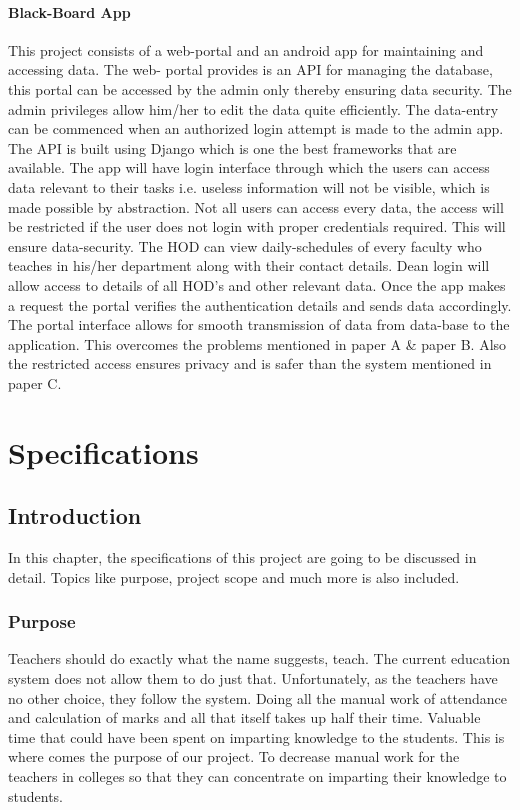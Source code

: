 \documentclass[BTech]{srmuthesis}
\begin{document}
\subsubsection{Black-Board App}
This project consists of a web-portal and an android app for maintaining and accessing data. The web-
portal provides is an \ac{API} for managing the database, this portal can be accessed by the admin only
thereby ensuring data security. The admin privileges allow him/her to edit the data quite efficiently. The
data-entry can be commenced when an authorized login attempt is made to the admin app. The \ac{API} is
built using Django which is one the best frameworks that are available. The app will have login interface
through which the users can access data relevant to their tasks i.e. useless information will not be
visible, which is made possible by abstraction. Not all users can access every data, the access will be
restricted if the user does not login with proper credentials required. This will ensure data-security. The
HOD can view daily-schedules of every faculty who teaches in his/her department along with their
contact details. Dean login will allow access to details of all HOD’s and other relevant data. Once the app
makes a request the portal verifies the authentication details and sends data accordingly. The portal
interface allows for smooth transmission of data from data-base to the application. This overcomes the
problems mentioned in paper A \& paper B. Also the restricted access ensures privacy and is safer than
the system mentioned in paper C.
\chapter{Specifications}
\section{Introduction}
In this chapter, the specifications of this project are going to be discussed in detail. Topics like purpose, project scope and much more is also included.
\subsection{Purpose}
Teachers should do exactly what the name suggests, teach. The current education system does not allow them to do just that. Unfortunately, as the teachers have no other choice, they follow the system. Doing all the manual work of attendance and calculation of marks and all that itself takes up half their time. Valuable time that could have been spent on imparting knowledge to the students. This is where comes the purpose of our project. To decrease manual work for the teachers in colleges so that they can concentrate on imparting their knowledge to students.
\end{document}
